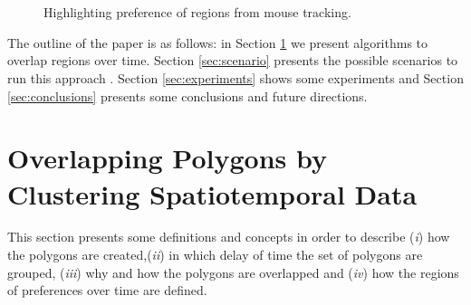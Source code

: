 \documentclass[runningheads,a4paper]{llncs}
\begin{document}
\begin{figure}
  \\ %
  \\ %
  \caption{Highlighting preference of regions from mouse tracking. }
  \label{fig:paris}
\end{figure} %

The outline of the paper is as follows: in Section \ref{sec:overpolygons}  we present algorithms to overlap regions over time. Section \ref{sec:scenario}  presents the possible scenarios to run this approach . Section  \ref{sec:experiments}  shows some  experiments and Section \ref{sec:conclusions}  presents some conclusions and future directions. 

\section{Overlapping Polygons by Clustering Spatiotemporal Data}
\label{sec:overpolygons}

This section presents some definitions and concepts in order to describe (\textit{i}) how the polygons are created,(\textit{ii}) in which delay of time the set of polygons are grouped, (\textit{iii})  why and how the polygons are overlapped and  (\textit{iv}) how the regions of preferences over time are defined.
\end{document}
